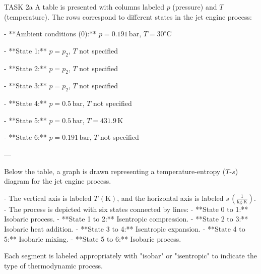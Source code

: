 TASK 2a  
A table is presented with columns labeled \( p \) (pressure) and \( T \) (temperature). The rows correspond to different states in the jet engine process:  

- **Ambient conditions (0):**  
  \( p = 0.191 \, \text{bar} \), \( T = 30^\circ\text{C} \)  

- **State 1:**  
  \( p = p_2 \), \( T \) not specified  

- **State 2:**  
  \( p = p_2 \), \( T \) not specified  

- **State 3:**  
  \( p = p_2 \), \( T \) not specified  

- **State 4:**  
  \( p = 0.5 \, \text{bar} \), \( T \) not specified  

- **State 5:**  
  \( p = 0.5 \, \text{bar} \), \( T = 431.9 \, \text{K} \)  

- **State 6:**  
  \( p = 0.191 \, \text{bar} \), \( T \) not specified  

---

Below the table, a graph is drawn representing a temperature-entropy (\( T \)-\( s \)) diagram for the jet engine process.  

- The vertical axis is labeled \( T \, (\text{K}) \), and the horizontal axis is labeled \( s \, \left( \frac{1}{\text{kg·K}} \right) \).  
- The process is depicted with six states connected by lines:  
  - **State 0 to 1:** Isobaric process.  
  - **State 1 to 2:** Isentropic compression.  
  - **State 2 to 3:** Isobaric heat addition.  
  - **State 3 to 4:** Isentropic expansion.  
  - **State 4 to 5:** Isobaric mixing.  
  - **State 5 to 6:** Isobaric process.  

Each segment is labeled appropriately with "isobar" or "isentropic" to indicate the type of thermodynamic process.